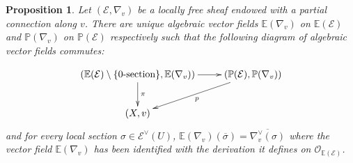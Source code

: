 \documentclass[12pt]{amsart}
\newcommand{\E}{\mathcal{E}}
\renewcommand{\P}{\mathbb{P}}
\theoremstyle{definition}
\theoremstyle{plain}
\newtheorem{proposition}[definition]{Proposition}
\theoremstyle{exampstyle}
\theoremstyle{exampstyle}\newtheorem{thmxbis}{Theorem}
\numberwithin{equation}{section}
\theoremstyle{remark}
\begin{document}
\begin{proposition} \label{totalspace} 
Let $(\mathcal E, \nabla_v)$ be a locally free sheaf endowed with a partial connection along $v$. There are unique algebraic vector fields $\mathbb{E}(\nabla_v)$ on $\mathbb{E}(\mathcal E)$ and $\mathbb{P}(\nabla_v)$ on $\mathbb{P}(\mathcal E)$ respectively such that the following diagram of algebraic vector fields commutes: 

$$\xymatrix { (\mathbb{E}(\mathcal E) \setminus \lbrace 0\text{-section} \rbrace , \mathbb{E}(\nabla_v)) \ar[r] \ar[d]^\pi & (\P(\E), \P(\nabla_v)) \ar[ld]^p \\ (X,v) }$$
and  for every local section $\sigma \in \mathcal E^\vee(U)$, 
$\mathbb{E}(\nabla_v)(\overline{\sigma}) = \overline{\nabla_v^\vee(\sigma)}$
where the vector field $\mathbb{E}(\nabla_v)$ has been identified with the derivation it defines on $\mathcal O_{\mathbb{E}(\mathcal E)}$.
\end{proposition} 
\end{document}
